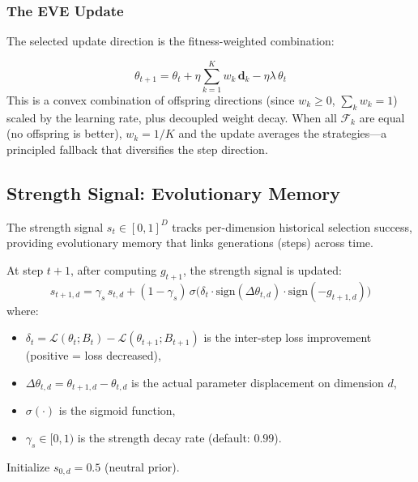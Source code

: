 \documentclass[12pt]{article}
\newcommand{\eqbox}[2]{%
  \begin{tcolorbox}[eqstyle, title={#1}]
    #2
  \end{tcolorbox}
}
\newcommand{\Loss}{\mathcal{L}}
\newcommand{\sign}{\mathrm{sign}}
\begin{document}
\subsubsection{The EVE Update}

The selected update direction is the fitness-weighted combination:

\eqbox{Definition 4 --- The EVE Update}{
\begin{equation}
  \theta_{t+1} = \theta_t
    + \eta \sum_{k=1}^{K} w_k\,\mathbf{d}_k
    - \eta\lambda\,\theta_t
  \label{eq:eve_update}
\end{equation}
\smallskip
This is a convex combination of offspring directions (since
$w_k \geq 0$, $\sum_k w_k = 1$) scaled by the learning rate, plus
decoupled weight decay.
When all $\mathcal{F}_k$ are equal (no offspring is better),
$w_k = 1/K$ and the update averages the strategies---a principled
fallback that diversifies the step direction.
}


\subsection{Strength Signal: Evolutionary Memory}
\label{ssec:strength}

The strength signal $s_t \in [0, 1]^D$ tracks per-dimension historical
selection success, providing evolutionary memory that links generations
(steps) across time.

\eqbox{Definition 5 --- Strength Signal Update}{
At step $t+1$, after computing $g_{t+1}$, the strength signal is updated:
\begin{equation}
  s_{t+1,d} = \gamma_s\, s_{t,d}
    + (1 - \gamma_s)\,\sigma\!\bigl(
      \delta_t \cdot \sign(\Delta\theta_{t,d})
      \cdot \sign(-g_{t+1,d})
    \bigr)
  \label{eq:strength}
\end{equation}
\smallskip
where:
\begin{itemize}[leftmargin=1.6em, itemsep=2pt]
  \item $\delta_t = \Loss(\theta_t; B_t) - \Loss(\theta_{t+1}; B_{t+1})$
    is the inter-step loss improvement (positive = loss decreased),
  \item $\Delta\theta_{t,d} = \theta_{t+1,d} - \theta_{t,d}$ is the
    actual parameter displacement on dimension $d$,
  \item $\sigma(\cdot)$ is the sigmoid function,
  \item $\gamma_s \in [0, 1)$ is the strength decay rate
    (default: $0.99$).
\end{itemize}
Initialize $s_{0,d} = 0.5$ (neutral prior).
}
\end{document}
